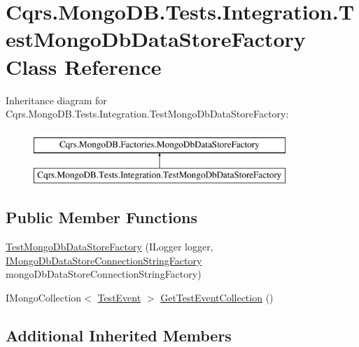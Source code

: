 \hypertarget{classCqrs_1_1MongoDB_1_1Tests_1_1Integration_1_1TestMongoDbDataStoreFactory}{}\section{Cqrs.\+Mongo\+D\+B.\+Tests.\+Integration.\+Test\+Mongo\+Db\+Data\+Store\+Factory Class Reference}
\label{classCqrs_1_1MongoDB_1_1Tests_1_1Integration_1_1TestMongoDbDataStoreFactory}
Inheritance diagram for Cqrs.\+Mongo\+D\+B.\+Tests.\+Integration.\+Test\+Mongo\+Db\+Data\+Store\+Factory\+:\begin{figure}[H]
\begin{center}
\leavevmode
\includegraphics[height=2.000000cm]{classCqrs_1_1MongoDB_1_1Tests_1_1Integration_1_1TestMongoDbDataStoreFactory}
\end{center}
\end{figure}
\subsection*{Public Member Functions}
\begin{DoxyCompactItemize}
\item 
\hyperlink{classCqrs_1_1MongoDB_1_1Tests_1_1Integration_1_1TestMongoDbDataStoreFactory_abb427efd7fcd28548fd02d09a2901994_abb427efd7fcd28548fd02d09a2901994}{Test\+Mongo\+Db\+Data\+Store\+Factory} (I\+Logger logger, \hyperlink{interfaceCqrs_1_1MongoDB_1_1Factories_1_1IMongoDbDataStoreConnectionStringFactory}{I\+Mongo\+Db\+Data\+Store\+Connection\+String\+Factory} mongo\+Db\+Data\+Store\+Connection\+String\+Factory)
\item 
I\+Mongo\+Collection$<$ \hyperlink{classCqrs_1_1Azure_1_1ServiceBus_1_1Tests_1_1Unit_1_1TestEvent}{Test\+Event} $>$ \hyperlink{classCqrs_1_1MongoDB_1_1Tests_1_1Integration_1_1TestMongoDbDataStoreFactory_a65d996d53f32b1a40121052193b582fa_a65d996d53f32b1a40121052193b582fa}{Get\+Test\+Event\+Collection} ()
\end{DoxyCompactItemize}
\subsection*{Additional Inherited Members}


